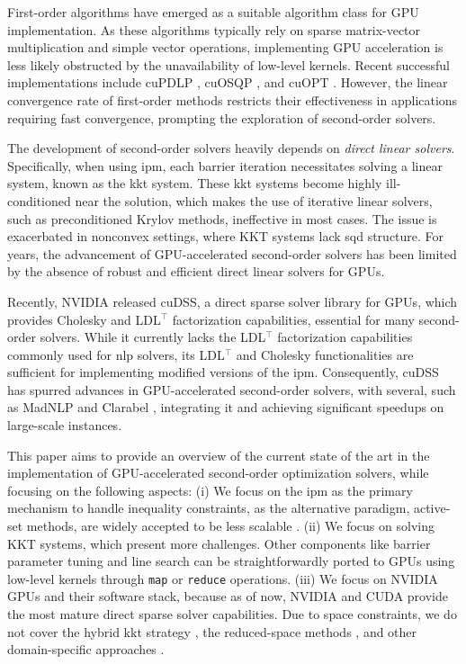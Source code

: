 \documentclass{article}
\begin{document}
First-order algorithms have emerged as a suitable algorithm class for GPU implementation. As these algorithms typically rely on sparse matrix-vector multiplication and simple vector operations, implementing GPU acceleration is less likely obstructed by the unavailability of low-level kernels. Recent successful implementations include cuPDLP \cite{luCuPDLPCStrengthenedImplementation2024,luCuPDLPFurtherEnhanced2025}, cuOSQP \cite{schubigerGPUAccelerationADMM2020}, and cuOPT \cite{NVIDIACuopt2025}. However, the linear convergence rate of first-order methods restricts their effectiveness in applications requiring fast convergence, prompting the exploration of second-order solvers.

The development of second-order solvers heavily depends on \emph{direct linear solvers}. Specifically, when using \gls*{ipm}, each barrier iteration necessitates solving a linear system, known as the \gls*{kkt} system. These \gls*{kkt} systems become highly ill-conditioned near the solution, which makes the use of iterative linear solvers, such as preconditioned Krylov methods, ineffective in most cases. The issue is exacerbated in nonconvex settings, where KKT systems lack \gls*{sqd} structure. For years, the advancement of GPU-accelerated second-order solvers has been limited by the absence of robust and efficient direct linear solvers for GPUs.


Recently, NVIDIA released cuDSS, a direct sparse solver library for GPUs, which provides Cholesky and LDL$^\top$ factorization capabilities, essential for many second-order solvers. While it currently lacks the LDL$^\top$ factorization capabilities commonly used for \gls*{nlp} solvers, its LDL$^\top$ and Cholesky functionalities are sufficient for implementing modified versions of the \gls*{ipm}. Consequently, cuDSS has spurred advances in GPU-accelerated second-order solvers, with several, such as MadNLP \cite{shinAcceleratingOptimalPower2024} and Clarabel \cite{goulartClarabelInteriorpointSolver2024}, integrating it and achieving significant speedups on large-scale instances.

This paper aims to provide an overview of the current state of the art in the implementation of GPU-accelerated second-order optimization solvers, while focusing on the following aspects: (i) We focus on the \gls*{ipm} as the primary mechanism to handle inequality constraints, as the alternative paradigm, active-set methods, are widely accepted to be less scalable \cite{nocedalNumericalOptimization2006}. (ii) We focus on solving KKT systems, which present more challenges. Other components like barrier parameter tuning and line search can be straightforwardly ported to GPUs using low-level kernels through \texttt{map} or \texttt{reduce} operations. (iii) We focus on NVIDIA GPUs and their software stack, because as of now, NVIDIA and CUDA provide the most mature direct sparse solver capabilities. Due to space constraints, we do not cover the hybrid \gls*{kkt} strategy \cite{regevHyKKTHybridDirectiterative2023}, the reduced-space methods \cite{pacaudAcceleratingCondensedInteriorPoint2023}, and other domain-specific approaches \cite{adabagMPCGPURealTimeNonlinear2024}.
\end{document}
